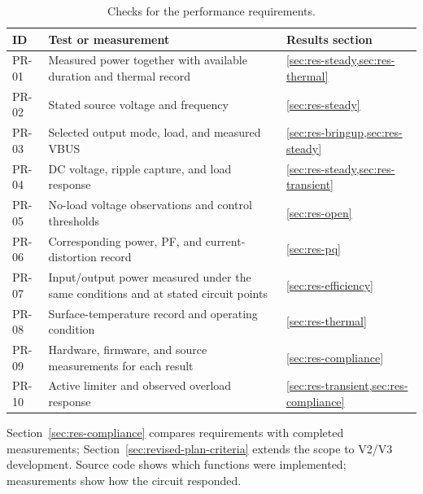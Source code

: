 \begin{table}[H]
\centering
\caption{Checks for the performance requirements.}
\label{tab:req-performance-verification}
\begin{tabularx}{\textwidth}{@{}L{0.10\textwidth}Y L{0.27\textwidth}@{}}
\toprule
ID & Test or measurement & Results section\\
\midrule
PR-01 & Measured power together with available duration and thermal record & \cref{sec:res-steady,sec:res-thermal}\\
PR-02 & Stated source voltage and frequency & \cref{sec:res-steady}\\
PR-03 & Selected output mode, load, and measured VBUS & \cref{sec:res-bringup,sec:res-steady}\\
PR-04 & DC voltage, ripple capture, and load response & \cref{sec:res-steady,sec:res-transient}\\
PR-05 & No-load voltage observations and control thresholds & \cref{sec:res-open}\\
PR-06 & Corresponding power, PF, and current-distortion record & \cref{sec:res-pq}\\
PR-07 & Input/output power measured under the same conditions and at stated circuit points & \cref{sec:res-efficiency}\\
PR-08 & Surface-temperature record and operating condition & \cref{sec:res-thermal}\\
PR-09 & Hardware, firmware, and source measurements for each result & \cref{sec:res-compliance}\\
PR-10 & Active limiter and observed overload response & \cref{sec:res-transient,sec:res-compliance}\\
\bottomrule
\end{tabularx}
\end{table}

Section~\ref{sec:res-compliance} compares requirements with completed measurements; Section~\ref{sec:revised-plan-criteria} extends the scope to V2/V3 development. Source code shows which functions were implemented; measurements show how the circuit responded.
